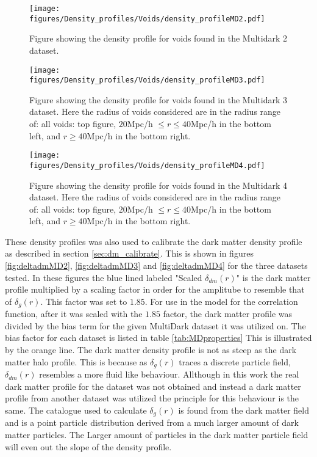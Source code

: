 \begin{figure}[H]
    \texttt{[image: figures/Density\_profiles/Voids/density\_profileMD2.pdf]}
    \caption{Figure showing the density profile for voids found in the Multidark 2 dataset.}
    \label{fig:deltaMD2}
\end{figure}
\begin{figure}[H]
    \texttt{[image: figures/Density\_profiles/Voids/density\_profileMD3.pdf]}
    \caption{Figure showing the density profile for voids found in the Multidark 3 dataset. Here the radius of voids considered are in the radius range of: all voids: top figure, $20$Mpc/h $\leq r\leq 40$Mpc/h in the bottom left, and $r\geq 40$Mpc/h in the bottom right.}
    \label{fig:deltaMD3}
\end{figure}
\begin{figure}[H]
    \texttt{[image: figures/Density\_profiles/Voids/density\_profileMD4.pdf]}
    \caption{Figure showing the density profile for voids found in the Multidark 4 dataset. Here the radius of voids considered are in the radius range of: all voids: top figure, $20$Mpc/h $\leq r\leq 40$Mpc/h in the bottom left, and $r\geq 40$Mpc/h in the bottom right.}
    \label{fig:deltaMD4}
\end{figure}
These density profiles was also used to calibrate the dark matter density profile as described in section \ref{sec:dm_calibrate}. This is shown in figures \ref{fig:deltadmMD2}, \ref{fig:deltadmMD3} and \ref{fig:deltadmMD4} for the three datasets tested.
In these figures the blue lined labeled "Scaled $\delta_{dm}(r)$" is the dark matter profile multiplied by a scaling factor in order for the amplitube to resemble that of $\delta_g(r)$. This factor was set to $1.85$. For use in the model for the correlation function, after it was scaled with the $1.85$ factor, the dark matter profile was divided by the bias term for the given MultiDark dataset it was utilized on. The bias factor for each dataset is listed in table \ref{tab:MDproperties} This is illustrated by the orange line.
The dark matter density profile is not as steep as the dark matter halo profile. This is because as $\delta_g(r)$ traces a discrete particle field, $\delta_{dm}(r)$ resembles a more fluid like behaviour. Allthough in this work the real dark matter profile for the dataset was not obtained and instead a dark matter profile from another dataset was utilized the principle for this behaviour is the same. The catalogue used to calculate $\delta_g(r)$ is found from the dark matter field and is a point particle distribution derived from a much larger amount of dark matter particles. The Larger amount of particles in the dark matter particle field will even out the slope of the density profile.\\\indent 
